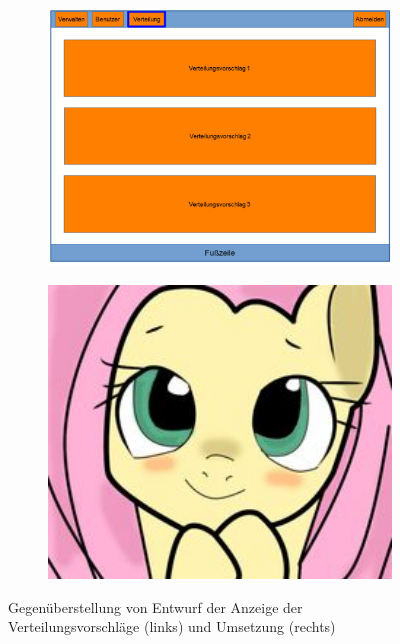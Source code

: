         \begin{figure}
            \centering
            \begin{subfigure}{0.49\textwidth}
                \includegraphics[width=1.0\textwidth]{./implementation/images/MockUpsBackend/backendDistribution.png}
            \end{subfigure}
            \begin{subfigure}{0.49\textwidth}
                \includegraphics[width=1.0\textwidth]{./implementation/images/dummy.jpg}
            \end{subfigure}
            \caption{Gegenüberstellung von Entwurf der Anzeige der Verteilungsvorschläge (links) und Umsetzung (rechts)}
            \label{fig:comparisonDistribution}
        \end{figure}